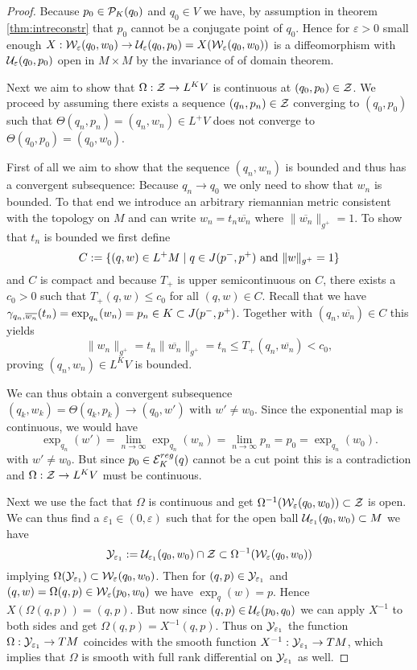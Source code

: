 \begin{proof}
    Because $p_0\in {\mathcal{P}}_K(q_0)$ and $q_0\in V$ we have, by assumption in theorem \ref{thm:intreconstr} that $p_0$ cannot be a conjugate point of $q_0$. Hence for $\varepsilon>0$ small enough $X:{\mathcal{W}}_{\varepsilon}(q_0,w_0)\to {\mathcal{U}}_{\varepsilon}(q_0,p_0) = X({\mathcal{W}}_{\varepsilon}(q_0,w_0))$ is a diffeomorphism with ${\mathcal{U}}_{\varepsilon}(q_0,p_0)$ open in $M\times M$ by the invariance of of domain theorem. 
    
    Next we aim to show that $\Omega:{\mathcal{Z}}\to L^KV$ is continuous at $(q_0,p_0)\in {\mathcal{Z}}$. We proceed by assuming there exists a sequence $(q_n,p_n)\in {\mathcal{Z}}$ converging to $(q_0,p_0)$ such that $\Theta(q_n,p_n)=(q_n,w_n)\in L^+V$ does not converge to $\Theta(q_0,p_0)=(q_0,w_0)$.

    First of all we aim to show that the sequence $(q_n,w_n)$ is bounded and thus has a convergent subsequence: Because $q_n\to q_0$ we only need to show that $w_n$ is bounded. To that end we introduce an arbitrary riemannian metric consistent with the topology on $M$ and can write $w_n = t_n \overline{w_n}$ where $\lVert \overline{w_n} \rVert_{g^+}=1$. To show that $t_n$ is bounded we first define 
    \[
        C:=\{(q,w)\in L^+M \mid q\in J(p^-,p^+) \text{ and } \lVert w \rVert_{g^+}=1\}
    \]
    and $C$ is compact and because $T_+$ is upper semicontinuous on $C$, there exists a $c_0>0$ such that $T_+(q,w)\leq c_0$ for all $(q,w)\in C$.
    Recall that we have $\gamma_{q_n,\overline{w_n}}(t_n)=\exp_{q_n}(w_n)=p_n \in K \subset J(p^-,p^+)$. Together with $(q_n,\overline{w_n}) \in C$ this yields 
    \[
        \lVert w_n \rVert_{g^+} = t_n\lVert \overline{w_n} \rVert_{g^+} = t_n \leq T_{+}(q_n,\overline{w_n})<c_0,
    \] proving $(q_n,w_n) \in L^KV$ is bounded.

    We can thus obtain a convergent subsequence $(q_k,w_k)=\Theta(q_k,p_k)\to (q_0,w')$ with $w'\neq w_0$. Since the exponential map is continuous, we would have 
    \[
        \exp_{q_n}(w') = \lim_{n\to \infty} \exp_{q_n}(w_n) = \lim_{n\to\infty} p_n = p_0 = \exp_{q_n}(w_0).
    \] with $w'\neq w_0$. But since $p_0\in {{\mathcal{E}}^{reg}_K}(q)$ cannot be a cut point this is a contradiction and $\Omega:{\mathcal{Z}}\to L^KV$ must be continuous.
    
    Next we use the fact that $\Omega$ is continuous and get $\Omega^{-1}({\mathcal{W}}_{\varepsilon}(q_0,w_0)) \subset {\mathcal{Z}}$ is open. We can thus find a $\varepsilon_1\in (0,\varepsilon)$ such that for the open ball ${\mathcal{U}}_{\varepsilon_1}(q_0,w_0)\subset M$ we have 
    \[
        {\mathcal{Y}}_{\varepsilon_1}:={\mathcal{U}}_{\varepsilon_1}(q_0,w_0) \cap {\mathcal{Z}} \subset \Omega^{-1}({\mathcal{W}}_{\varepsilon}(q_0,w_0))
    \] implying $\Omega({\mathcal{Y}}_{\varepsilon_1}) \subset {\mathcal{W}}_{\varepsilon}(q_0,w_0)$. Then for $(q,p)\in {\mathcal{Y}}_{\varepsilon_1}$ and $(q,w) = \Omega(q,p)\in {\mathcal{W}}_\varepsilon(p_0,w_0)$ we have $\exp_q(w) = p$. Hence $X(\Omega(q,p))=(q,p)$. But now since $(q,p)\in \mathcal{U}_\varepsilon(p_0,q_0)$ we can apply $X^{-1}$ to both sides and get $\Omega(q,p)=X^{-1}(q,p)$. Thus on ${\mathcal{Y}}_{\varepsilon_1}$ the function $\Omega:{\mathcal{Y}}_{\varepsilon_1}\to TM$ coincides with the smooth function $X^{-1}:{\mathcal{Y}}_{\varepsilon_1}\to TM$, which implies that $\Omega$ is smooth with full rank differential on ${\mathcal{Y}}_{\varepsilon_1}$ as well.
    

\end{proof}
